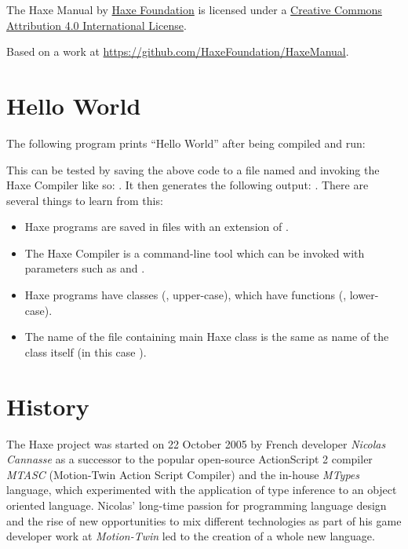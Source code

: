 The Haxe Manual by \href{http://haxe.org/foundation}{Haxe Foundation} is licensed under a \href{http://creativecommons.org/licenses/by/4.0/}{Creative Commons Attribution 4.0 International License}.

Based on a work at \href{https://github.com/HaxeFoundation/HaxeManual}{https://github.com/HaxeFoundation/HaxeManual}.

\section{Hello World}
\label{introduction-hello-world}

The following program prints ``Hello World'' after being compiled and run:

This can be tested by saving the above code to a file named  and invoking the Haxe Compiler like so: . It then generates the following output: . There are several things to learn from this:

\begin{itemize}
	\item Haxe programs are saved in files with an extension of .
	\item The Haxe Compiler is a command-line tool which can be invoked with parameters such as  and .
	\item Haxe programs have classes (, upper-case), which have functions (, lower-case). 
	\item The name of the file containing main Haxe class is the same as name of the class itself (in this case ). 
\end{itemize}

\section{History}
\label{introduction-haxe-history}

The Haxe project was started on 22 October 2005 by French developer \emph{Nicolas Cannasse} as a successor to the popular open-source ActionScript 2 compiler \emph{MTASC} (Motion-Twin Action Script Compiler) and the in-house \emph{MTypes} language, which experimented with the application of type inference to an object oriented language. Nicolas' long-time passion for programming language design and the rise of new opportunities to mix different technologies as part of his game developer work at \emph{Motion-Twin} led to the creation of a whole new language.

